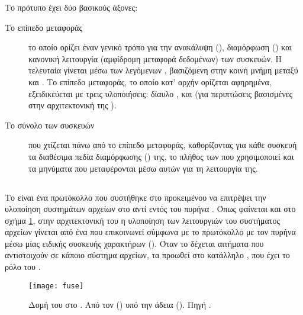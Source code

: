 Το πρότυπο έχει δύο βασικούς άξονες:
\begin{description}
    \item[Το επίπεδο μεταφοράς] το οποίο ορίζει έναν γενικό τρόπο για την
        ανακάλυψη (), διαμόρφωση () και κανονική
        λειτουργία (αμφίδρομη μεταφορά δεδομένων) των συσκευών. Η τελευταία
        γίνεται μέσω των λεγόμενων , βασιζόμενη στην κοινή μνήμη
        μεταξύ \guest{} και . Το επίπεδο μεταφοράς, το οποίο
        κατ' αρχήν ορίζεται αφηρημένα, εξειδικεύεται με τρεις υλοποιήσεις:
        δίαυλο ,  και  (για περιπτώσεις βασισμένες στην αρχιτεκτονική  της
        ).
    \item[Το σύνολο των συσκευών] που χτίζεται πάνω από το επίπεδο μεταφοράς,
        καθορίζοντας για κάθε συσκευή τα διαθέσιμα πεδία διαμόρφωσης
        () της, το πλήθος των  που
        χρησιμοποιεί και τα μηνύματα που μεταφέρονται μέσω αυτών για τη
        λειτουργία της.
\end{description}

\subsection{}
Το  είναι ένα πρωτόκολλο που συστήθηκε στο
\linux{} προκειμένου να επιτρέψει την υλοποίηση συστημάτων αρχείων στο
 αντί εντός του πυρήνα \cite{fuse}.
Όπως φαίνεται και στο σχήμα \ref{fig:fuse}, στην αρχιτεκτονική του η υλοποίηση
των λειτουργιών του συστήματος αρχείων γίνεται από ένα 
που επικοινωνεί σύμφωνα με το πρωτόκολλο με τον πυρήνα μέσω μίας ειδικής
συσκευής χαρακτήρων (\texttt{}). Όταν το  δέχεται
 αιτήματα που αντιστοιχούν σε κάποιο  σύστημα αρχείων, τα
προωθεί στο κατάλληλο , που έχει το ρόλο του .

\begin{figure}
    \centering
    \texttt{[image: fuse]}
    \caption[Δομή του  στο \linux{}]{Δομή του  στο
        \linux{}. Από τον 
        () υπό την άδεια
        ().
        Πηγή
        .}
    \label{fig:fuse}
\end{figure}

